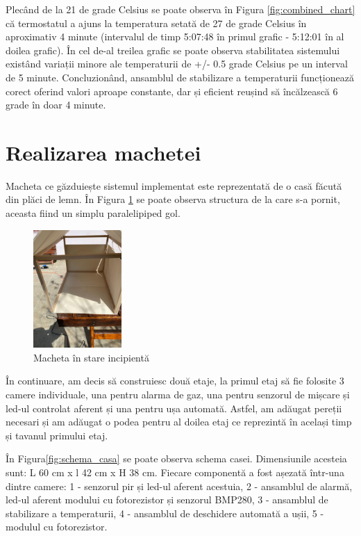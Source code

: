 Plecând de la 21 de grade Celsius se poate observa în Figura \ref{fig:combined_chart} că termostatul a ajuns la temperatura setată de 27 de grade Celsius în aproximativ 4 minute (intervalul de timp 5:07:48 în primul grafic - 5:12:01 în al doilea grafic). În cel de-al treilea grafic se poate observa stabilitatea sistemului existând variații minore ale temperaturii de +/- 0.5 grade Celsius pe un interval de 5 minute. Concluzionând, ansamblul de stabilizare a temperaturii funcționează corect oferind valori aproape constante, dar și eficient reușind să încălzească 6 grade în doar 4 minute.

\section{Realizarea machetei}

Macheta ce găzduiește sistemul implementat este reprezentată de o casă făcută din plăci de lemn. În Figura \ref{fig:casa_init} se poate observa structura de la care s-a pornit, aceasta fiind un simplu paralelipiped gol. 

\begin{figure}[H]
\includegraphics[width=0.3\textwidth, height=0.4\textwidth]{bachelors_ro/images/casa_init.jpg}
\caption{Macheta în stare incipientă}
\label{fig:casa_init}
\end{figure}

În continuare, am decis să construiesc două etaje, la primul etaj să fie folosite 3 camere individuale, una pentru alarma de gaz, una pentru senzorul de mișcare și led-ul controlat aferent și una pentru ușa automată. Astfel, am adăugat pereții necesari și am adăugat o podea pentru al doilea etaj ce reprezintă în același timp și tavanul primului etaj.

În Figura\ref{fig:schema_casa} se poate observa schema casei. Dimensiunile acesteia sunt: L 60 cm x l 42 cm x H 38 cm. Fiecare componentă a fost așezată într-una dintre camere: 1 - senzorul pir și led-ul aferent acestuia, 2 - ansamblul de alarmă, led-ul aferent modului cu fotorezistor și  senzorul BMP280, 3 - ansamblul de stabilizare a temperaturii, 4 - ansamblul de deschidere automată a ușii, 5 - modulul cu fotorezistor.

